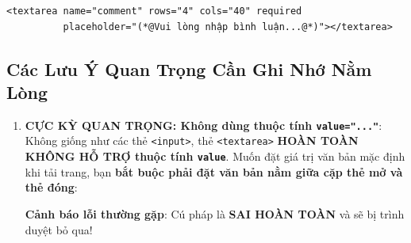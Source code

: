 \documentclass[11pt,oneside]{book}
\newcommand{\codeinline}[1]{\textcolor{accentOrange}{\texttt{#1}}}
\begin{document}
\begin{codeWindow}
\begin{lstlisting}[language=HTML5]
<textarea name="comment" rows="4" cols="40" required 
          placeholder="(*@Vui lòng nhập bình luận...@*)"></textarea>
\end{lstlisting}
\end{codeWindow}

\subsection{Các Lưu Ý Quan Trọng Cần Ghi Nhớ Nằm Lòng}

\begin{warnBox}
\begin{enumerate}[leftmargin=1.5em, itemsep=6pt, parsep=0pt]
    \item \textbf{CỰC KỲ QUAN TRỌNG: Không dùng thuộc tính \codeinline{value="..."}}:
    Không giống như các thẻ \codeinline{<input>}, thẻ \codeinline{<textarea>} \textbf{HOÀN TOÀN KHÔNG HỖ TRỢ thuộc tính \codeinline{value}}. Muốn đặt giá trị văn bản mặc định khi tải trang, bạn \textbf{bắt buộc phải đặt văn bản nằm giữa cặp thẻ mở và thẻ đóng}:
    \par\vspace{4pt}
    \begin{center}
    \tcbox[on line, arc=3pt, colback=primaryBlue!8, colframe=primaryBlue!40, boxsep=3pt, left=10pt, right=10pt, top=4pt, bottom=4pt]{%
      \small\ttfamily\bfseries \textcolor{primaryBlue}{<textarea>}\textcolor{black}{Văn bản giá trị mặc định}\textcolor{primaryBlue}{</textarea>}%
    }
    \end{center}
    \par\vspace{2pt}
    \textcolor{red!80!black}{\textbf{Cảnh báo lỗi thường gặp}}: Cú pháp  là \textbf{SAI HOÀN TOÀN} và sẽ bị trình duyệt bỏ qua!


\end{enumerate}
\end{warnBox}
\end{document}
